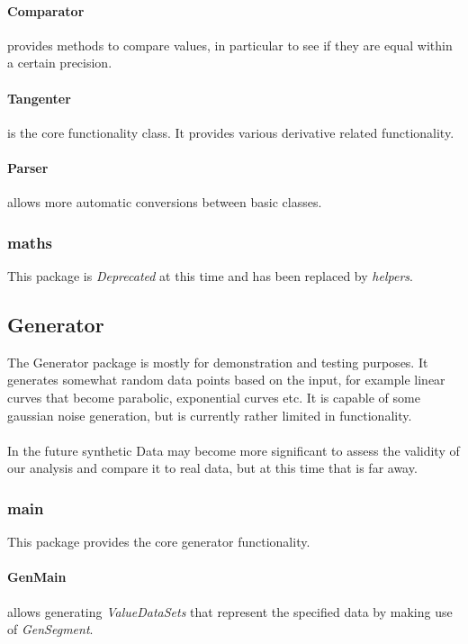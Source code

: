 \documentclass[main.tex]{subfiles}
\begin{document}
        \paragraph{Comparator}  provides methods to compare values, in particular to see if they are equal within a certain precision.
        
        \paragraph{Tangenter} is the core functionality class. It provides various derivative related functionality.
        
        \paragraph{Parser} allows more automatic conversions between basic classes.
        
      \subsubsection*{maths}
        
        This package is \textit{Deprecated} at this time and has been replaced by \textit{helpers}.
      
    \subsection{Generator}
    
      The Generator package is mostly for demonstration and testing purposes. It generates somewhat random data points based on the input, for example linear curves that become parabolic, exponential curves etc. It is capable of some gaussian noise generation, but is currently rather limited in functionality.
      \\\\
      In the future synthetic Data may become more significant to assess the validity of our analysis and compare it to real data, but at this time that is far away.
      
      \subsubsection*{main}
        
        This package provides the core generator functionality.
        
        \paragraph{GenMain} allows generating \textit{ValueDataSets} that represent the specified data by making use of \textit{GenSegment}.
        
\end{document}
